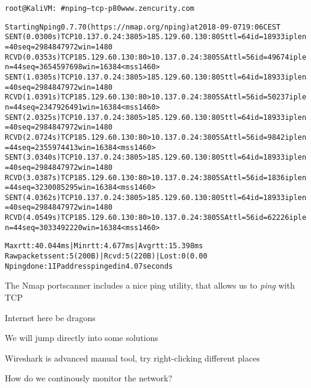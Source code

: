 \documentclass[Screen16to9,17pt]{foils}
\begin{document}
\begin{alltt}\footnotesize
  root@KaliVM:~# nping --tcp -p 80 www.zencurity.com

  Starting Nping 0.7.70 ( https://nmap.org/nping ) at 2018-09-07 19:06 CEST
  SENT (0.0300s) TCP 10.137.0.24:3805 > 185.129.60.130:80 S ttl=64 id=18933 iplen=40  seq=2984847972 win=1480
  RCVD (0.0353s) TCP 185.129.60.130:80 > 10.137.0.24:3805 SA ttl=56 id=49674 iplen=44  seq=3654597698 win=16384 <mss 1460>
  SENT (1.0305s) TCP 10.137.0.24:3805 > 185.129.60.130:80 S ttl=64 id=18933 iplen=40  seq=2984847972 win=1480
  RCVD (1.0391s) TCP 185.129.60.130:80 > 10.137.0.24:3805 SA ttl=56 id=50237 iplen=44  seq=2347926491 win=16384 <mss 1460>
  SENT (2.0325s) TCP 10.137.0.24:3805 > 185.129.60.130:80 S ttl=64 id=18933 iplen=40  seq=2984847972 win=1480
  RCVD (2.0724s) TCP 185.129.60.130:80 > 10.137.0.24:3805 SA ttl=56 id=9842 iplen=44  seq=2355974413 win=16384 <mss 1460>
  SENT (3.0340s) TCP 10.137.0.24:3805 > 185.129.60.130:80 S ttl=64 id=18933 iplen=40  seq=2984847972 win=1480
  RCVD (3.0387s) TCP 185.129.60.130:80 > 10.137.0.24:3805 SA ttl=56 id=1836 iplen=44  seq=3230085295 win=16384 <mss 1460>
  SENT (4.0362s) TCP 10.137.0.24:3805 > 185.129.60.130:80 S ttl=64 id=18933 iplen=40  seq=2984847972 win=1480
  RCVD (4.0549s) TCP 185.129.60.130:80 > 10.137.0.24:3805 SA ttl=56 id=62226 iplen=44  seq=3033492220 win=16384 <mss 1460>

  Max rtt: 40.044ms | Min rtt: 4.677ms | Avg rtt: 15.398ms
  Raw packets sent: 5 (200B) | Rcvd: 5 (220B) | Lost: 0 (0.00%)
  Nping done: 1 IP address pinged in 4.07 seconds
\end{alltt}

\begin{list2}
\item The Nmap portscanner includes a nice ping utility, that allows us to \emph{ping} with TCP
\end{list2}








\vskip 2cm
\centerline{\Large Internet here be dragons}

We will jump directly into some solutions



\begin{list2}
\item Wireshark is advanced manual tool, try right-clicking different places
\item How do we continously monitor the network?
\end{list2}
\end{document}
